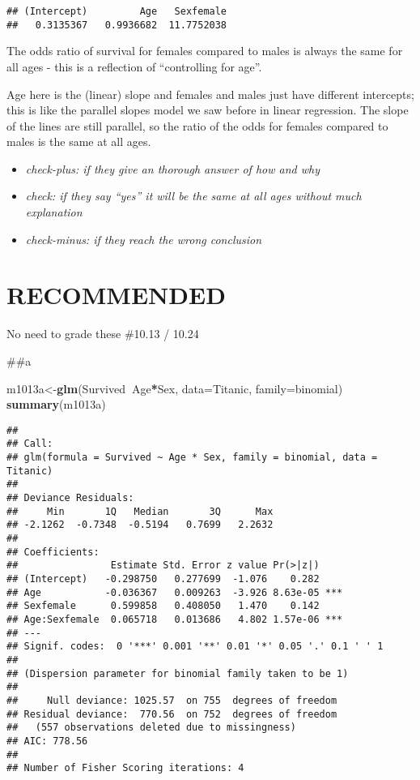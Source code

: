 \documentclass[]{article}
\newenvironment{Shaded}{\begin{snugshade}}{\end{snugshade}}
\newcommand{\DataTypeTok}[1]{\textcolor[rgb]{0.13,0.29,0.53}{#1}}
\newcommand{\KeywordTok}[1]{\textcolor[rgb]{0.13,0.29,0.53}{\textbf{#1}}}
\newcommand{\NormalTok}[1]{#1}
\newcommand{\OperatorTok}[1]{\textcolor[rgb]{0.81,0.36,0.00}{\textbf{#1}}}
\providecommand{\tightlist}{%
  \setlength{\itemsep}{0pt}\setlength{\parskip}{0pt}}
\begin{document}
\begin{verbatim}
## (Intercept)         Age   Sexfemale 
##   0.3135367   0.9936682  11.7752038
\end{verbatim}

The odds ratio of survival for females compared to males is always the
same for all ages - this is a reflection of ``controlling for age''.

Age here is the (linear) slope and females and males just have different
intercepts; this is like the parallel slopes model we saw before in
linear regression. The slope of the lines are still parallel, so the
ratio of the odds for females compared to males is the same at all ages.

\begin{itemize}
\tightlist
\item
  \emph{check-plus: if they give an thorough answer of how and why}
\item
  \emph{check: if they say ``yes'' it will be the same at all ages
  without much explanation}
\item
  \emph{check-minus: if they reach the wrong conclusion}
\end{itemize}

\newpage

\hypertarget{recommended}{%
\section{\texorpdfstring{\textbf{RECOMMENDED}}{RECOMMENDED}}\label{recommended}}

No need to grade these \#10.13 / 10.24

\#\#a

\begin{Shaded}
\begin{Highlighting}[]
\NormalTok{m1013a<-}\KeywordTok{glm}\NormalTok{(Survived}\OperatorTok{~}\NormalTok{Age}\OperatorTok{*}\NormalTok{Sex, }\DataTypeTok{data=}\NormalTok{Titanic, }\DataTypeTok{family=}\NormalTok{binomial)}
\KeywordTok{summary}\NormalTok{(m1013a)}
\end{Highlighting}
\end{Shaded}

\begin{verbatim}
## 
## Call:
## glm(formula = Survived ~ Age * Sex, family = binomial, data = Titanic)
## 
## Deviance Residuals: 
##     Min       1Q   Median       3Q      Max  
## -2.1262  -0.7348  -0.5194   0.7699   2.2632  
## 
## Coefficients:
##                Estimate Std. Error z value Pr(>|z|)    
## (Intercept)   -0.298750   0.277699  -1.076    0.282    
## Age           -0.036367   0.009263  -3.926 8.63e-05 ***
## Sexfemale      0.599858   0.408050   1.470    0.142    
## Age:Sexfemale  0.065718   0.013686   4.802 1.57e-06 ***
## ---
## Signif. codes:  0 '***' 0.001 '**' 0.01 '*' 0.05 '.' 0.1 ' ' 1
## 
## (Dispersion parameter for binomial family taken to be 1)
## 
##     Null deviance: 1025.57  on 755  degrees of freedom
## Residual deviance:  770.56  on 752  degrees of freedom
##   (557 observations deleted due to missingness)
## AIC: 778.56
## 
## Number of Fisher Scoring iterations: 4
\end{verbatim}
\end{document}

